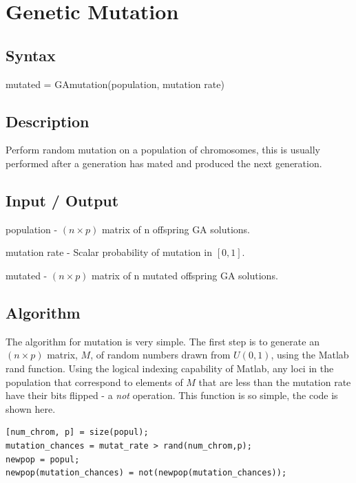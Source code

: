 \documentclass{book}
\newcommand{\textcode}[1]{\textsf{\small #1}}   %
\begin{document}
\section{Genetic Mutation}

\subsection*{Syntax}

\textcode{mutated = GAmutation(population, mutation rate)}

\subsection*{Description}

Perform random mutation on a population of chromosomes, this is usually
performed after a generation has mated and produced the next generation.

\subsection*{Input / Output}

\begin{compactitem}

\item \textcode{population} - $\left( n \times p \right)$ matrix of n offspring GA solutions.

\item \textcode{mutation rate} - Scalar probability of mutation in $\left[0,1\right]$.

\item \textcode{mutated} - $\left( n \times p \right)$ matrix of n mutated offspring GA solutions.

\end{compactitem}

\subsection*{Algorithm}

The algorithm for mutation is very simple. The first step is to generate an $%
\left( n\times p\right) $ matrix, $M$, of random numbers drawn
from $U\left( 0,1\right) $, using the Matlab \textcode{rand}
function. Using the logical indexing capability of Matlab, any
loci in the population that correspond to elements of $M$ that
are less than the mutation rate have their bits flipped - a
\textit{not} operation. This function is so simple, the code is
shown here.
\begin{verbatim}
[num_chrom, p] = size(popul);
mutation_chances = mutat_rate > rand(num_chrom,p);
newpop = popul;
newpop(mutation_chances) = not(newpop(mutation_chances));
\end{verbatim}
\end{document}
